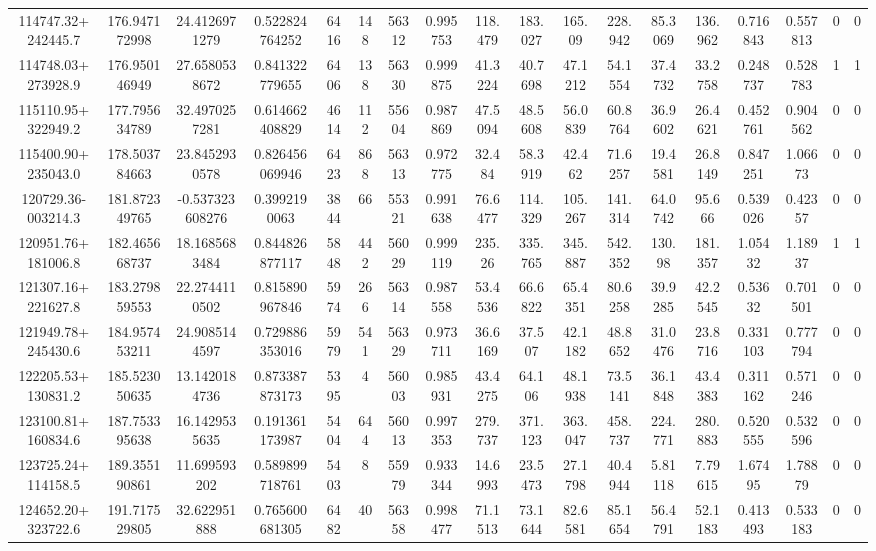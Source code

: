 \begin{table}
\begin{tabular}{cccccccccccccccccc}
114747.32+242445.7 & 176.947172998 & 24.4126971279 & 0.522824764252 & 6416 & 148 & 56312 & 0.995753 & 118.479 & 183.027 & 165.09 & 228.942 & 85.3069 & 136.962 & 0.716843 & 0.557813 & 0 & 0 \\
114748.03+273928.9 & 176.950146949 & 27.6580538672 & 0.841322779655 & 6406 & 138 & 56330 & 0.999875 & 41.3224 & 40.7698 & 47.1212 & 54.1554 & 37.4732 & 33.2758 & 0.248737 & 0.528783 & 1 & 1 \\
115110.95+322949.2 & 177.795634789 & 32.4970257281 & 0.614662408829 & 4614 & 112 & 55604 & 0.987869 & 47.5094 & 48.5608 & 56.0839 & 60.8764 & 36.9602 & 26.4621 & 0.452761 & 0.904562 & 0 & 0 \\
115400.90+235043.0 & 178.503784663 & 23.8452930578 & 0.826456069946 & 6423 & 868 & 56313 & 0.972775 & 32.484 & 58.3919 & 42.462 & 71.6257 & 19.4581 & 26.8149 & 0.847251 & 1.06673 & 0 & 0 \\
120729.36-003214.3 & 181.872349765 & -0.537323608276 & 0.3992190063 & 3844 & 66 & 55321 & 0.991638 & 76.6477 & 114.329 & 105.267 & 141.314 & 64.0742 & 95.666 & 0.539026 & 0.42357 & 0 & 0 \\
120951.76+181006.8 & 182.465668737 & 18.1685683484 & 0.844826877117 & 5848 & 442 & 56029 & 0.999119 & 235.26 & 335.765 & 345.887 & 542.352 & 130.98 & 181.357 & 1.05432 & 1.18937 & 1 & 1 \\
121307.16+221627.8 & 183.279859553 & 22.2744110502 & 0.815890967846 & 5974 & 266 & 56314 & 0.987558 & 53.4536 & 66.6822 & 65.4351 & 80.6258 & 39.9285 & 42.2545 & 0.53632 & 0.701501 & 0 & 0 \\
121949.78+245430.6 & 184.957453211 & 24.9085144597 & 0.729886353016 & 5979 & 541 & 56329 & 0.973711 & 36.6169 & 37.507 & 42.1182 & 48.8652 & 31.0476 & 23.8716 & 0.331103 & 0.777794 & 0 & 0 \\
122205.53+130831.2 & 185.523050635 & 13.1420184736 & 0.873387873173 & 5395 & 4 & 56003 & 0.985931 & 43.4275 & 64.106 & 48.1938 & 73.5141 & 36.1848 & 43.4383 & 0.311162 & 0.571246 & 0 & 0 \\
123100.81+160834.6 & 187.753395638 & 16.1429535635 & 0.191361173987 & 5404 & 644 & 56013 & 0.997353 & 279.737 & 371.123 & 363.047 & 458.737 & 224.771 & 280.883 & 0.520555 & 0.532596 & 0 & 0 \\
123725.24+114158.5 & 189.355190861 & 11.699593202 & 0.589899718761 & 5403 & 8 & 55979 & 0.933344 & 14.6993 & 23.5473 & 27.1798 & 40.4944 & 5.81118 & 7.79615 & 1.67495 & 1.78879 & 0 & 0 \\
124652.20+323722.6 & 191.717529805 & 32.622951888 & 0.765600681305 & 6482 & 40 & 56358 & 0.998477 & 71.1513 & 73.1644 & 82.6581 & 85.1654 & 56.4791 & 52.1183 & 0.413493 & 0.533183 & 0 & 0 \\

\end{tabular}
\end{table}
